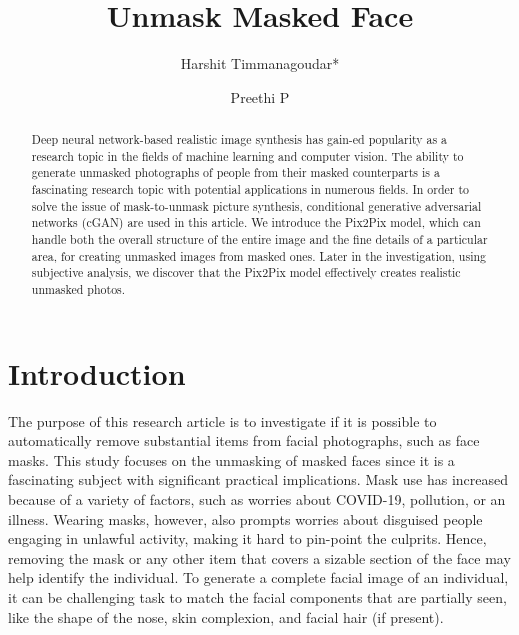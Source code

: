 \documentclass{36_styles/svproc}
\begin{document}
\mainmatter 

\title{Unmask Masked Face}

\author{Harshit Timmanagoudar{*} \and Preethi P}

\maketitle 

\begin{abstract}
Deep neural network-based realistic image synthesis has gain-ed popularity as a research topic in the fields of machine learning and computer vision. The ability to generate unmasked photographs of people from their masked counterparts is a fascinating research topic with potential applications in numerous fields. In order to solve the issue of mask-to-unmask picture synthesis, conditional generative adversarial networks (cGAN) are used in this article. We introduce the Pix2Pix model, which can handle both the overall structure of the entire image and the fine details of a particular area, for creating unmasked images from masked ones. Later in the investigation, using subjective analysis, we discover that the Pix2Pix model effectively creates realistic unmasked photos.
\end{abstract}

\section{Introduction}
The purpose of this research article is to investigate if it is possible to automatically remove substantial items from facial photographs, such as face masks. This study focuses on the unmasking of masked faces since it is a fascinating subject with significant practical implications. Mask use has increased because of a variety of factors, such as worries about COVID-19, pollution, or an illness. Wearing masks, however, also prompts worries about disguised people engaging in unlawful activity, making it hard to pin-point the culprits. Hence, removing the mask or any other item that covers a sizable section of the face may help identify the individual. To generate a complete facial image of an individual, it can be challenging task to match the facial components that are partially seen, like the shape of the nose, skin complexion, and facial hair (if present).
\end{document}
